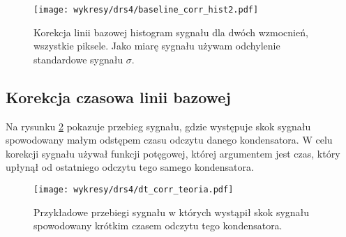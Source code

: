 \documentclass[a4paper,11pt,twoside]{article}
\begin{document}
\begin{figure}[H] 
\centering
\texttt{[image: wykresy/drs4/baseline\_corr\_hist2.pdf]}
\caption{Korekcja linii bazowej histogram sygnału dla dwóch wzmocnień, wszystkie piksele. Jako miarę sygnału używam odchylenie standardowe sygnału $\sigma$.}
\label{fig:baseline_corr_hist}
\end{figure}

\newpage
\subsection{Korekcja czasowa linii bazowej}
Na rysunku \ref{fig:dt_corr_Waveform} pokazuje przebieg sygnału, gdzie występuje skok sygnału spowodowany małym odstępem czasu odczytu danego kondensatora. W celu korekcji sygnału używał funkcji potęgowej, której argumentem jest czas, który upłynął od ostatniego odczytu tego samego kondensatora.  
\begin{figure}[H] 
\centering
\texttt{[image: wykresy/drs4/dt\_corr\_teoria.pdf]}
\caption{Przykładowe przebiegi sygnału w których wystąpił skok sygnału spowodowany krótkim czasem odczytu tego kondensatora.}
\label{fig:dt_corr_Waveform}
\end{figure}
\end{document}
